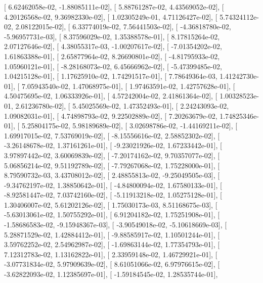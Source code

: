 \documentclass{article}
\begin{document}
       [  6.62462058e-02,  -1.88085111e-02],
       [  5.88761287e-02,   4.43569052e-02],
       [  4.20126568e-02,   9.36982330e-02],
       [  1.02305249e-01,   4.71126427e-02],
       [  5.74324112e-02,   2.08122015e-02],
       [  6.33774019e-02,   7.56441503e-02],
       [ -4.36818780e-02,  -5.96957731e-03],
       [  8.37596029e-02,   1.35388578e-01],
       [  8.17815264e-02,   2.07127646e-02],
       [  4.38055317e-03,  -1.00207617e-02],
       [ -7.01354202e-02,   1.61863388e-01],
       [  2.65877964e-02,   8.26690801e-02],
       [ -4.81795933e-02,   1.05960121e-01],
       [ -8.28168073e-02,   6.45666962e-02],
       [ -5.47399485e-02,   1.04215128e-01],
       [  1.17625910e-02,   1.74291517e-01],
       [  7.78649364e-03,   1.41242730e-01],
       [  7.05943540e-02,   1.47068975e-01],
       [  1.97463591e-02,   1.42757628e-01],
       [  4.50475695e-02,   1.06333926e-01],
       [  4.57242004e-02,   2.41861364e-02],
       [  1.00328523e-01,   2.61236780e-02],
       [  5.45025569e-02,   1.47352493e-01],
       [  2.24243093e-02,   1.09082031e-01],
       [  4.74898793e-02,   9.22502889e-02],
       [  7.20263679e-02,   1.74825346e-01],
       [  5.25804175e-02,   5.98189689e-02],
       [  3.02698786e-02,  -1.44169211e-02],
       [  1.69917015e-02,   7.53769019e-02],
       [ -8.15556616e-02,   2.58852302e-02],
       [ -3.26148678e-02,   1.37161261e-01],
       [ -9.23021926e-02,   1.67233442e-01],
       [  3.97897442e-02,   3.60069839e-02],
       [ -7.20174162e-02,   9.70357077e-02],
       [  5.06856214e-02,   9.51192789e-02],
       [ -7.79267068e-02,   1.75228000e-01],
       [  8.79590732e-03,   3.43708012e-02],
       [  2.48855813e-02,  -9.25049505e-03],
       [ -9.34762197e-02,   1.38850642e-01],
       [ -4.84800094e-02,   1.67580133e-01],
       [ -8.92581447e-02,   7.03742160e-02],
       [ -5.11913218e-02,   1.05275128e-01],
       [  1.30406007e-02,   5.61202126e-02],
       [  1.75030173e-03,   8.51168675e-03],
       [ -5.63013061e-02,   1.50755292e-01],
       [  6.91204182e-02,   1.75251908e-01],
       [ -1.58686583e-02,  -9.15948367e-03],
       [ -3.90549018e-02,  -5.10618669e-03],
       [  5.28871529e-02,   1.42884412e-01],
       [ -9.88585917e-02,   1.10501244e-01],
       [  3.59762252e-02,   2.54962987e-02],
       [ -1.69863144e-02,   1.77354793e-01],
       [  7.12312783e-02,   1.13162822e-01],
       [  2.33959148e-02,   1.46729921e-01],
       [ -3.07731834e-02,   5.97909639e-02],
       [  8.61051066e-02,   6.97976615e-02],
       [ -3.62822093e-02,   1.12385697e-01],
       [ -1.59184545e-02,   1.28535744e-01],
\end{document}
